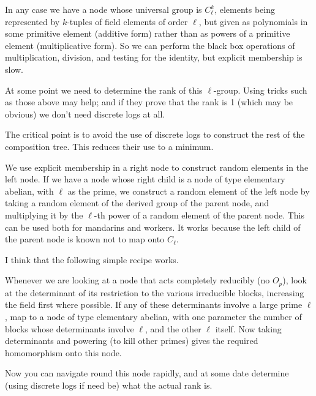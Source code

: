 In any case we have a node whose universal group is $C_\ell^k$, elements being represented by
$k$-tuples of field elements of order $\ell$, but given as polynomials in some primitive element
(additive form) rather than as powers of a primitive element (multiplicative form).  So we can perform
the black box operations of multiplication, division, and testing for the identity, but
explicit membership is slow.

At some point we need to determine the rank of this $\ell$-group.  Using tricks such as those
above may help; and if they prove that the rank is 1 (which may be obvious) we don't need
discrete logs at all.

The critical point is to avoid the use of discrete logs to construct the rest of the composition tree.
This reduces their use to a minimum.

We use explicit membership in a right node to construct random elements in the left node.  If we have
a node whose right child is a node of type elementary abelian, with
$\ell$ as the prime, we construct a random element of the left node by taking a random 
element of the derived group of the parent node, and multiplying it by the $\ell$-th power of
a random element of the parent node.  This can be used both for mandarins and workers.  It works
because the left child of the parent node is known not to map onto $C_\ell$.

I think that the following simple recipe works.

Whenever we are looking at a node that acts completely reducibly (no $O_p$), look at the determinant
of its restriction to the various irreducible blocks, increasing the field first where possible.  If any of these determinants involve a large prime $\ell$, map to a
node of type elementary abelian, with one parameter the number of blocks whose determinants 
involve $\ell$, and the other $\ell$ itself.  Now taking determinants and powering (to kill other primes)
gives the required homomorphism onto this node.

Now you can navigate round this node rapidly, and at some date determine (using discrete logs if
need be) what the actual rank is.

\bye